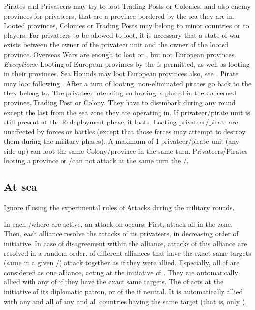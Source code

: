 \begin{todo}
 Pirates and Privateers may try to
loot Trading Posts or Colonies, and also enemy provinces for privateers, that
are a province bordered by the sea they are in.
\bparag Looted provinces, Colonies or Trading Posts may belong to minor
countries or to players. For privateers to be allowed to loot, it is necessary
that a state of war exists between the owner of the privateer unit and the
owner of the looted province. Overseas Wars are enough to loot \TP or \COL,
but not European provinces.
\bparag \textit{Exceptions:} Looting of European provinces by the
\Barbaresques is permitted, as well as looting in their provinces. Sea Hounds
may loot European provinces also, see .
\bparag Pirate may loot following . After a
turn of looting, non-eliminated pirates go back to the \STZ they belong to.
\bparag The privateer intending on looting is placed in the concerned
province, Trading Post or Colony. They have to disembark during any round
except the last from the sea zone they are operating in.
\bparag If privateer/pirate unit is still present at the Redeployment phase,
it loots. Looting privateer/pirate are unaffected by forces or battles (except
that those forces may attempt to destroy them during the military phases).
\bparag A maximum of 1 privateer/pirate unit (any side up) can loot the same
Colony/province in the same turn. Privateers/Pirates looting a province or
\COL/\TP can not attack at the same turn the \CTZ/\STZ.
\end{todo}

\subsection{At sea}
\begin{designnote}
  Ignore if using the experimental rules of Attacks during the military
  rounds.
\end{designnote}

 In each \STZ/\CTZ where
\corsaire are active, an attack on \TradeFLEET occurs.
\bparag First,  \corsaire attack all \TradeFLEET in the zone.
\bparag Then, each alliance resolve the attacks of its privateers, in
decreasing order of initiative. In case of disagreement within the alliance,
attacks of this alliance are resolved in a random order.
\bparag \corsaire of different alliances that have the exact same targets
(same \TradeFLEET in a given \STZ/\CTZ) attack together as if they were
allied.
\bparag Especially, all \corsaire of \Barbaresques are considered as one
alliance, acting at the initiative of \TUR. They are automatically allied with
any \corsaire of \TUR if they have the exact same targets.
\bparag The \corsaire of \paysChevaliers acts at the initiative of its
diplomatic patron, or of the \SDCF if neutral. It is automatically allied with
any and all \corsaire of any and all countries having the same target (that
is, only \TUR).


